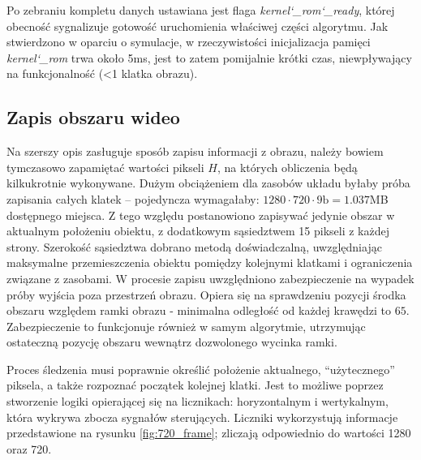 Po zebraniu kompletu danych ustawiana jest flaga \textit{kernel\char`_rom\char`_ready}, której obecność sygnalizuje gotowość uruchomienia właściwej części algorytmu. 
Jak stwierdzono w oparciu o symulacje, w rzeczywistości inicjalizacja pamięci \textit{kernel\char`_rom} trwa około 5ms, jest to zatem pomijalnie krótki czas, niewpływający na funkcjonalność (<1 klatka obrazu).



\subsection{Zapis obszaru wideo}
\label{ssec:savideo}

Na szerszy opis zasługuje sposób zapisu informacji z obrazu, należy bowiem tymczasowo zapamiętać wartości pikseli $H$, na których obliczenia będą kilkukrotnie wykonywane. 
Dużym obciążeniem dla zasobów układu byłaby próba zapisania całych klatek -- pojedyncza wymagałaby: $1280\cdot720\cdot9\text{b} = 1.037$MB dostępnego miejsca. 
Z tego względu postanowiono zapisywać jedynie obszar w aktualnym położeniu obiektu, z dodatkowym sąsiedztwem 15 pikseli z każdej strony. Szerokość sąsiedztwa dobrano metodą doświadczalną, uwzględniając maksymalne przemieszczenia obiektu pomiędzy kolejnymi klatkami i ograniczenia związane z zasobami.
W procesie zapisu uwzględniono zabezpieczenie na wypadek próby wyjścia poza przestrzeń obrazu. Opiera się na sprawdzeniu pozycji środka obszaru względem ramki obrazu - minimalna odległość od każdej krawędzi to $65$. Zabezpieczenie to funkcjonuje również w samym algorytmie, utrzymując ostateczną pozycję obszaru wewnątrz dozwolonego wycinka ramki. %


Proces śledzenia musi poprawnie określić położenie aktualnego, \enquote{użytecznego} piksela, a także rozpoznać początek kolejnej klatki. 
Jest to możliwe poprzez stworzenie logiki opierającej się na licznikach: horyzontalnym i wertykalnym, która wykrywa zbocza sygnałów sterujących. %
Liczniki wykorzystują informacje przedstawione na rysunku \ref{fig:720_frame}; zliczają odpowiednio do wartości 1280 oraz 720.

